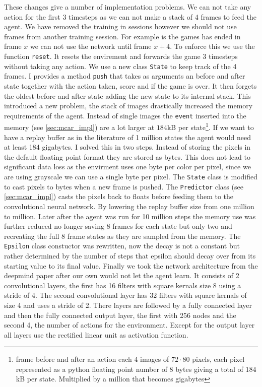 These changes give a number of implementation problems. We can not take any action for the first 3 timesteps as we can not make a stack of 4 frames to feed the agent. We have removed the training in sessions however we should not use frames from another training session. For example is the games has ended in frame $x$ we can not use the network until frame $x+4$. To enforce this we use the function \texttt{reset}. It resets the envirement and forwards the game 3 timesteps without taking any action. We use a new class \texttt{State} to keep track of the 4 frames. I provides a method \texttt{push} that takes as arguments an before and after state together with the action taken, score and if the game is over. It then forgets the oldest before and after state adding the new state to its internal stack.
%
This introduced a new problem, the stack of images drastically increased the memory requirements of the agent. Instead of single images the \texttt{event} inserted into the memory (see \autoref{sec:mcar_impl}) are a lot larger at $184$kB per state\footnote{frame before and after an action each $4$ images of $72\cdot80$ pixels, each pixel represented as a python floating point number of $8$ bytes giving a total of $184$kB per state. Multiplied by a million that becomes gigabytes}. If we want to have a replay buffer as in the literature\cite{DQN} of 1 million states the agent would need at least 184 gigabytes. I solved this in two steps. Instead of storing the pixels in the default floating point format they are stored as bytes. This does not lead to significant data loss as the envirment uses one byte per color per pixel, since we are using grayscale we can use a single byte per pixel. The \texttt{State} class is modified to cast pixels to bytes when a new frame is pushed. The \texttt{Predictor} class (see \autoref{sec:mcar_impl}) casts the pixels back to floats before feeding them to the convolutional neural network. By lowering the replay buffer size from one million to  million. Later after the agent was run for 10 million steps the memory use was further reduced no longer saving 8 frames for each state but only two and recreating the full 8 frame states as they are sampled from the memory.
%
The \texttt{Epsilon} class constuctor was rewritten, now the decay is not a constant but rather determined by the number of steps that epsilon should decay over from its starting value to its final value.
%
Finally we took the network architecture from the deepmind paper\cite{DQN} after our own would not let the agent learn. It consists of 2 convolutional layers, the first has 16 filters with square kernals size 8 using a stride of 4. The second convolutional layer has 32 filters with square kernals of size 4 and uses a stride of 2. There layers are followed by a fully connected layer and then the fully connected output layer, the first with 256 nodes and the second 4, the number of actions for the environment. Except for the output layer all layers use the rectified linear unit as activation function.